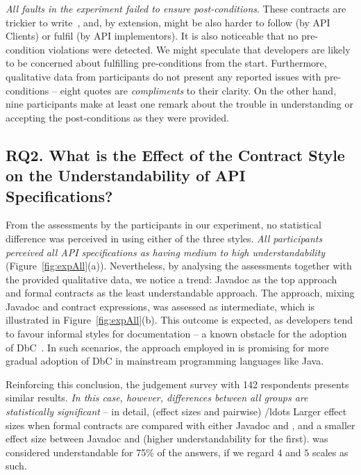 \emph{All faults in the experiment failed to ensure post-conditions}. 
These contracts are trickier to write~\cite{Rosenblum}, and, by extension, might be also harder to follow (by API Clients) or fulfil (by API implementors). 
It is also noticeable that no pre-condition violations were detected. We might speculate that developers are likely to be concerned about fulfilling pre-conditions from the start.%
Furthermore, qualitative data from participants do not present any reported issues with pre-conditions -- eight quotes are \emph{compliments} to their clarity. On the other hand, nine participants make at least one remark about the trouble in understanding or accepting the post-conditions as they were provided.


\subsection{RQ2. What is the Effect of the Contract Style on the Understandability of API Specifications?}
\label{rq2}

From the assessments by the participants in our experiment, no statistical difference was perceived in using either of the three styles. \emph{All participants perceived all API specifications as having medium to high understandability} (Figure~\ref{fig:expAll}(a)). 
Nevertheless, by analysing the assessments together with the provided qualitative data, we notice a trend: Javadoc as the top approach and formal contracts as the least understandable approach. The \contractjdoc{} approach, mixing Javadoc and contract expressions, was assessed as intermediate, which is illustrated in Figure~\ref{fig:expAll}(b).
This outcome is expected, as developers tend to favour informal styles for documentation -- a known obstacle for the adoption of DbC~\cite{Polikarpova-etal09}. In such scenarios, the approach employed in \contractjdoc{} is promising for more gradual adoption of DbC in mainstream programming languages like Java.

Reinforcing this conclusion, the judgement survey with 142 respondents presents similar results. 
\emph{In this case, however, differences between all groups are statistically significant} -- in detail, (effect sizes and pairwise) /ldots
Larger effect sizes when formal contracts are compared with either Javadoc and \contractjdoc{}, and a smaller effect size between Javadoc and \contractjdoc{} (higher understandability for the first).
\contractjdoc{} was considered understandable for 75\% of the answers, if we regard $4$ and $5$ scales as such.

